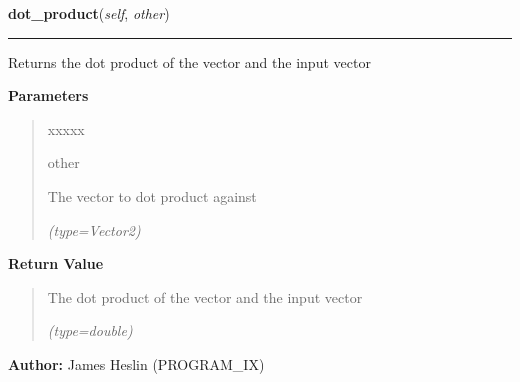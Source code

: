     \label{pystroke:vector2:Vector2:dot_product}

    \vspace{0.5ex}

\hspace{.8\funcindent}\begin{boxedminipage}{\funcwidth}

    \raggedright \textbf{dot\_product}(\textit{self}, \textit{other})

    \vspace{-1.5ex}

    \rule{\textwidth}{0.5\fboxrule}
\setlength{\parskip}{2ex}
    Returns the dot product of the vector and the input vector

\setlength{\parskip}{1ex}
      \textbf{Parameters}
      \vspace{-1ex}

      \begin{quote}
        \begin{Ventry}{xxxxx}

          \item[other]

          The vector to dot product against

            {\it (type=Vector2)}

        \end{Ventry}

      \end{quote}

      \textbf{Return Value}
    \vspace{-1ex}

      \begin{quote}
      The dot product of the vector and the input vector

      {\it (type=double)}

      \end{quote}

\textbf{Author:} James Heslin (PROGRAM\_IX)



    \end{boxedminipage}

    \label{pystroke:vector2:Vector2:cross_product}


